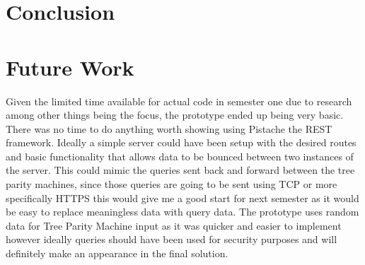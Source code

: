 \section{Conclusion}



\section{Future Work}
Given the limited time available for actual code in semester one due to research among other things being the focus, the prototype ended up being very basic. There was no time to do anything worth showing using Pistache the REST framework. Ideally a simple server could have been setup with the desired routes and basic functionality that allows data to be bounced between two instances of the server. This could mimic the queries sent back and forward between the tree parity machines, since those queries are going to be sent using TCP or more specifically HTTPS this would give me a good start for next semester as it would be easy to replace meaningless data with query data.
The prototype uses random data for Tree Parity Machine input as it was quicker and easier to implement however ideally queries should have been used for security purposes and will definitely make an appearance in the final solution.



